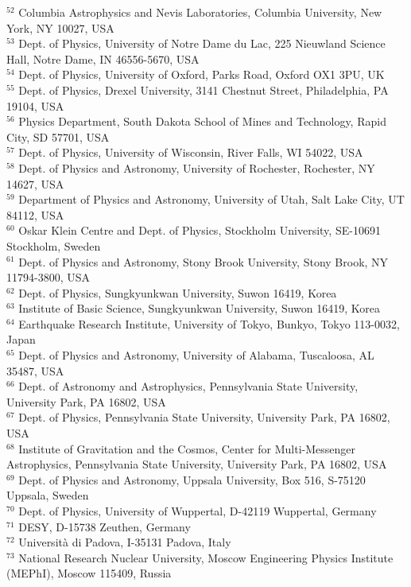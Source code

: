 \documentclass[a4paper,11pt]{article}
\begin{document}
$^{52}$ Columbia Astrophysics and Nevis Laboratories, Columbia University, New York, NY 10027, USA \\
$^{53}$ Dept. of Physics, University of Notre Dame du Lac, 225 Nieuwland Science Hall, Notre Dame, IN 46556-5670, USA \\
$^{54}$ Dept. of Physics, University of Oxford, Parks Road, Oxford OX1 3PU, UK \\
$^{55}$ Dept. of Physics, Drexel University, 3141 Chestnut Street, Philadelphia, PA 19104, USA \\
$^{56}$ Physics Department, South Dakota School of Mines and Technology, Rapid City, SD 57701, USA \\
$^{57}$ Dept. of Physics, University of Wisconsin, River Falls, WI 54022, USA \\
$^{58}$ Dept. of Physics and Astronomy, University of Rochester, Rochester, NY 14627, USA \\
$^{59}$ Department of Physics and Astronomy, University of Utah, Salt Lake City, UT 84112, USA \\
$^{60}$ Oskar Klein Centre and Dept. of Physics, Stockholm University, SE-10691 Stockholm, Sweden \\
$^{61}$ Dept. of Physics and Astronomy, Stony Brook University, Stony Brook, NY 11794-3800, USA \\
$^{62}$ Dept. of Physics, Sungkyunkwan University, Suwon 16419, Korea \\
$^{63}$ Institute of Basic Science, Sungkyunkwan University, Suwon 16419, Korea \\
$^{64}$ Earthquake Research Institute, University of Tokyo, Bunkyo, Tokyo 113-0032, Japan \\
$^{65}$ Dept. of Physics and Astronomy, University of Alabama, Tuscaloosa, AL 35487, USA \\
$^{66}$ Dept. of Astronomy and Astrophysics, Pennsylvania State University, University Park, PA 16802, USA \\
$^{67}$ Dept. of Physics, Pennsylvania State University, University Park, PA 16802, USA \\
$^{68}$ Institute of Gravitation and the Cosmos, Center for Multi-Messenger Astrophysics, Pennsylvania State University, University Park, PA 16802, USA \\
$^{69}$ Dept. of Physics and Astronomy, Uppsala University, Box 516, S-75120 Uppsala, Sweden \\
$^{70}$ Dept. of Physics, University of Wuppertal, D-42119 Wuppertal, Germany \\
$^{71}$ DESY, D-15738 Zeuthen, Germany \\
$^{72}$ Universit{\`a} di Padova, I-35131 Padova, Italy \\
$^{73}$ National Research Nuclear University, Moscow Engineering Physics Institute (MEPhI), Moscow 115409, Russia
\end{document}
